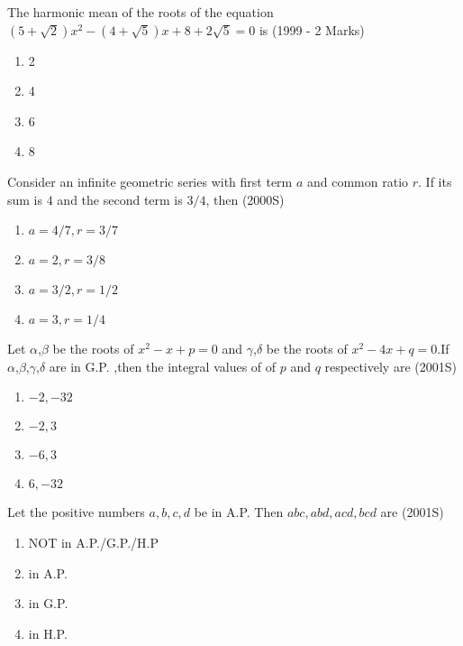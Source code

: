 \item The harmonic mean of the roots of the equation
        $(5+\sqrt{2})x^2-(4+\sqrt{5})x+8+2\sqrt{5}=0$ is 
        \hfill(1999 - 2 Marks)
        \begin{multicols}{4}
            
        
        \begin{enumerate}
            \item 2
            \item 4
            \item 6
            \item 8
        \end{enumerate}
        \end{multicols}
\item Consider an infinite geometric series with first term $a$ and common ratio $r$. If its sum is $4$ and the second term is $3/4$, then \hfill (2000S)
        \begin{multicols}{2}
        \begin{enumerate}
            \item $a=4/7,r=3/7$
            \item $a=2,r=3/8$
            \item $a=3/2,r=1/2$
            \item $a=3,r=1/4$
            \end{enumerate}
            \end{multicols}
\item Let $\alpha$,$\beta$ be the roots of $x^2-x+p=0$ and $\gamma$,$\delta$ be the roots of $x^2-4x+q=0$.If $\alpha$,$\beta$,$\gamma$,$\delta$ are in G.P. ,then the integral values of of $p$ and $q$ respectively are \hfill(2001S)
            \begin{multicols}{4}
            \begin{enumerate}
                \item $-2,-32$
                \item $-2,3$
                \item $-6,3$
                \item $6,-32$
        
    \end{enumerate}
    \end{multicols}
\item Let the positive numbers $a,b,c,d$ be in A.P. Then $abc,abd,acd,bcd$ are \hfill(2001S)
    \begin{multicols}{2}
    \begin{enumerate}
        \item NOT in A.P./G.P./H.P
        \item in A.P.
        \item in G.P.
        \item  in H.P.
        \end{enumerate}
        \end{multicols}

